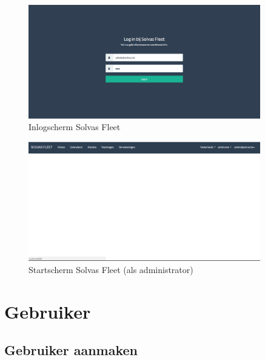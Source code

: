 \documentclass[11pt,openany]{article}
\begin{document}
\begin{figure}
	\centering
	\includegraphics[width=0.9\textwidth]{img/fig_a.png}
	\caption{Inlogscherm Solvas Fleet}
\end{figure}

\begin{figure}
	\centering
	\includegraphics[width=0.9\textwidth]{img/fig_b.png}
	\caption{Startscherm Solvas Fleet (als administrator)}
\end{figure}

\newpage
\section{Gebruiker}
\subsection{Gebruiker aanmaken}
\end{document}
